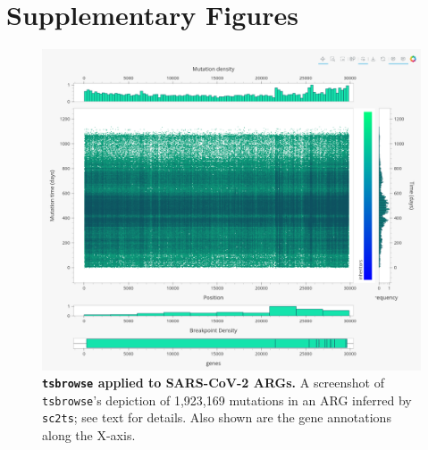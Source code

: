 \documentclass[unnumsec,webpdf,contemporary,large,namedate]{oup-authoring-template}
\begin{document}
\clearpage
\section{Supplementary Figures}
\begin{figure}[h]
    \centering
    \includegraphics[width=0.95\linewidth]{figures/SuppFig1.png}
    \caption{\textbf{\texttt{tsbrowse} applied to SARS-CoV-2 ARGs.}
        A screenshot of \texttt{tsbrowse}'s depiction of
        1,923,169 mutations in an
        ARG inferred by \texttt{sc2ts}; see text for details. Also shown are the
        gene annotations along the X-axis.}
    \label{fig:Supplementary_Figure_1}
\end{figure}
\end{document}
